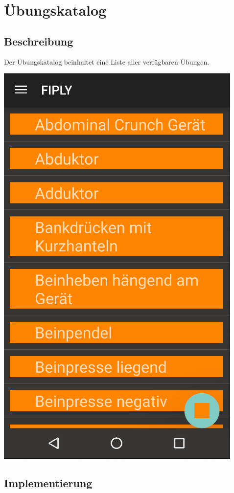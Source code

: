 \documentclass[FIPLY_base.tex]{subfiles}
\begin{document}
\section{Übungskatalog}

\subsection{Beschreibung}
Der Übungskatalog beinhaltet eine Liste aller verfügbaren Übungen.

\includegraphics[scale=0.4]{img/Uebungskatalog}

\subsection{Implementierung}
\end{document}
